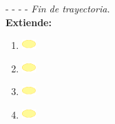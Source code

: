 - - - - \textit{Fin de trayectoria.} \\

\textbf{\large{Extiende:}}

\begin{enumerate}
	\item \includegraphics[width=15pt]{./Figuras/iconosCU/herramienta.png} 
	\item \includegraphics[width=15pt]{./Figuras/iconosCU/herramienta.png} 
	\item \includegraphics[width=15pt]{./Figuras/iconosCU/herramienta.png} 
	\item \includegraphics[width=15pt]{./Figuras/iconosCU/herramienta.png} 
\end{enumerate}

\clearpage